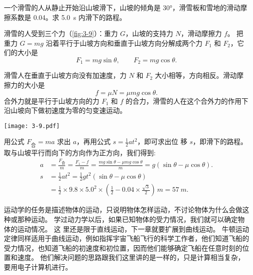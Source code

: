 \begin{example}
一个滑雪的人从静止开始沿山坡滑下，山坡的倾角是 \ang{30}，滑雪板和雪地的滑动摩擦系数是 0.04。求 \qty{5.0}{s} 内滑下的路程。
\end{example}

\begin{solution}
滑雪的人受到三个力（\cref{fig:3-9}）：重力 $G$，山坡的支持力 $N$，滑动摩擦力 $f$。
把重力 $G=mg$ 沿着平行于山坡方向和垂直于山坡方向分解成两个力 $F_1$ 和 $F_2$，它们的大小是
\[F_1=mg\sin\theta ,\qquad  F_2=mg\cos\theta. \]
\begin{minipage}{0.6\linewidth}
滑雪人在垂直于山坡方向没有加速度，力 $N$ 和 $F_2$ 大小相等，方向相反。滑动摩擦力的大小是
\[f=\mu N=\mu mg\cos\theta.\]
合外力就是平行于山坡方向的力 $F_1$ 和 $f$ 的合力，滑雪的人在这个合外力的作用下沿山坡向下做初速度为零的匀变速运动。
\end{minipage}\hfill
\begin{minipage}{0.38\linewidth}\centering
  \begin{figurehere}
    \texttt{[image: 3-9.pdf]}
    \caption{}\label{fig:3-9}
  \end{figurehere}
\end{minipage}

\bigskip
用公式 $F_{\text{合}}=ma$ 求出 $a$，再用公式 $s=\frac{1}{2}at^2$，即可求出位
移 $s$，即滑下的路程。取与山坡平行而向下的方向作为正方向，我们得到:
\[\begin{split}
a&=\frac{F_{\text{合}}}{m}=\frac{F_1-f}{m}=\frac{mg\sin\theta-\mu mg\cos\theta }{m}=g(\sin\theta-\mu \cos\theta).\\
s&=\frac{1}{2}at^2=\frac{1}{2}gt^2(\sin\theta-\mu \cos\theta)\\
&=\frac{1}{2}\times 9.8\times 5.0^2\times \left( \frac{1}{2}-0.04\times \frac{\sqrt{3}}{2}\right)\,\unit{m}=\qty{57}{m}.
\end{split} \]
\end{solution}
    
运动学的任务是描述物体的运动，只说明物体怎样运动，不讨论物体为什么会做这种或那种运动。
学过动力学以后，如果已知物体的受力情况，我们就可以确定物体的运动情况。
这
里还是限于直线运动，下一章就要扩展到曲线运动。
牛顿运动定律同样适用于曲线运动，例如指挥宇宙飞船飞行的科学工作者，他们知道飞船的受力情况，也知道飞船的初速度和初位置，因而他们能够确定飞船在任意时刻的位置和速度。
他们解决问题的思路跟我们这里讲的是一样的，只是计算相当复杂，要用电子计算机进行。

